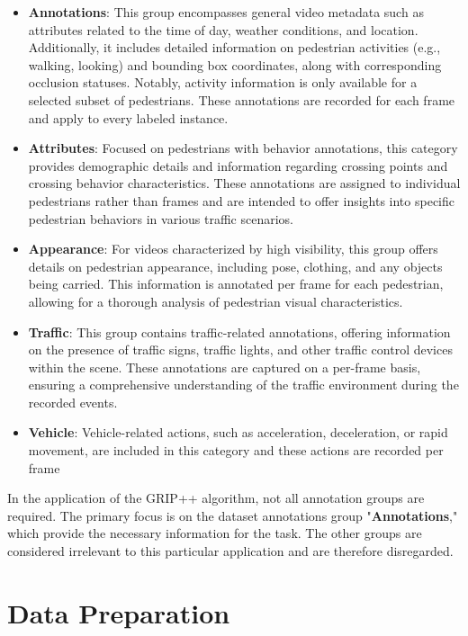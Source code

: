 \begin{itemize}
    \item \textbf{Annotations}: This group encompasses general video metadata such as attributes related to the time of day, weather conditions, and location. Additionally, it includes detailed information on pedestrian activities (e.g., walking, looking) and bounding box coordinates, along with corresponding occlusion statuses. Notably, activity information is only available for a selected subset of pedestrians. These annotations are recorded for each frame and apply to every labeled instance.
    \item \textbf{Attributes}: Focused on pedestrians with behavior annotations, this category provides demographic details and information regarding crossing points and crossing behavior characteristics. These annotations are assigned to individual pedestrians rather than frames and are intended to offer insights into specific pedestrian behaviors in various traffic scenarios.
    \item \textbf{Appearance}: For videos characterized by high visibility, this group offers details on pedestrian appearance, including pose, clothing, and any objects being carried. This information is annotated per frame for each pedestrian, allowing for a thorough analysis of pedestrian visual characteristics.
    \item \textbf{Traffic}: This group contains traffic-related annotations, offering information on the presence of traffic signs, traffic lights, and other traffic control devices within the scene. These annotations are captured on a per-frame basis, ensuring a comprehensive understanding of the traffic environment during the recorded events.
    \item \textbf{Vehicle}: Vehicle-related actions, such as acceleration, deceleration, or rapid movement, are included in this category and these actions are recorded per frame
\end{itemize}

\tab In the application of the GRIP++ algorithm, not all annotation groups are required. The primary focus is on the dataset annotations group "\textbf{Annotations}," which provide the necessary information for the task. The other groups are considered irrelevant to this particular application and are therefore disregarded.

\section{Data Preparation}

